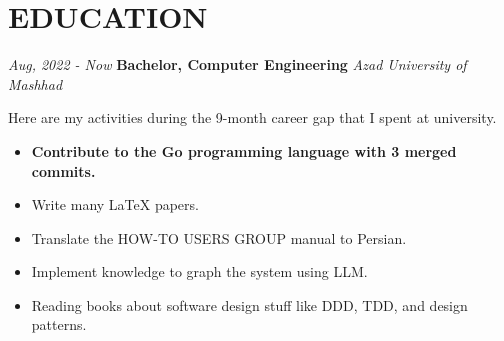 \documentclass{engineercv}
\begin{document}
\section{EDUCATION}

\begin{twocolentry}{\textit{Aug, 2022 - Now}}
  \textbf{Bachelor, Computer Engineering}
  \textit{Azad University of Mashhad}

  \vspace{0.2 cm}
  Here are my activities during the 9-month career gap that I spent at university.
  \vspace{0.2 cm}

  \begin{itemize}
    \item \textbf{Contribute to the Go programming language with 3 merged commits.}
    \item Write many LaTeX papers.
    \item Translate the HOW-TO USERS GROUP manual to Persian.
    \item Implement knowledge to graph the system using LLM.
    \item Reading books about software design stuff like DDD, TDD, and design patterns.
  \end{itemize}
\end{twocolentry}
\end{document}
